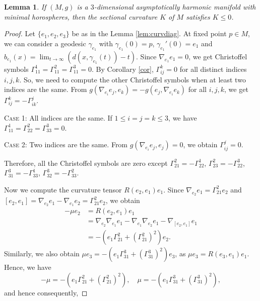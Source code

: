 \documentclass[12pt,a4paper]{amsart}
\newtheorem{Lem}[Thm]{Lemma}
\theoremstyle{definition}
\theoremstyle{remark}
\newcommand \<{\langle}
\renewcommand \>{\rangle}
\begin{document}
\begin{Lem}\label{lem:curvature}
 If $(M,g)$ is a $3$-dimensional asymptotically harmonic manifold with minimal horospheres, then the sectional curvature $K$ of $M$ satisfies $K \le 0$.
\end{Lem}
\begin{proof}
Let  $\{e_1,e_2,e_3\}$  be as in the  Lemma \ref{lem:curvdiag}. At fixed point $p\in M$,  we can consider a geodesic $\gamma_{e_1}$ with $\gamma_{e_1}(0)=p$, $\gamma_{e_1}'(0)=e_1$ and $b_{e_1}(x)=\displaystyle\lim_{t\to \infty}(d(x,\gamma_{e_1}(t))-t)$. Since $\nabla_{e_1}e_1 = 0$, we get Christoffel symbols $\Gamma_{11}^{1}=\Gamma_{11}^{2}=\Gamma_{11}^{3}=0$. By {Corollary} \ref{cor}, $\Gamma_{ij}^k =0$ for all distinct indices $i,j,k$. So, we need to compute  {the} other Christoffel symbols when at least two indices are the same. From $g(\nabla_{e_i}e_j , e_k) = -g(e_j, \nabla_{e_i} e_k)$ for all $i,j,k$, we get $\Gamma_{ij}^k = -\Gamma_{ik}^j$.

\smallskip
\noindent\textsc{Case 1}: All indices are the same.  If $1\le i=j=k \le 3$, we have $\Gamma_{11}^1 = \Gamma_{22}^2 = \Gamma_{33}^3=0$.


\smallskip
\noindent\textsc{Case 2}: Two indices are the same. From $g(\nabla_{e_i}e_j , e_j)=0$, we obtain $\Gamma_{ij}^j=0$.

Therefore, all the Christoffel symbols are zero except $\Gamma_{21}^2=-\Gamma_{22}^1$, $\Gamma_{23}^2=-\Gamma_{22}^3$, $\Gamma_{31}^3=-\Gamma_{33}^1$, $\Gamma_{32}^3=-\Gamma_{33}^2$.

Now we compute the curvature tensor $R(e_2,e_1)e_1$. Since $\nabla_{e_2}e_1 = \Gamma_{21}^2 e_2$ and $[e_2,e_1] = \nabla_{e_2}e_1 - \nabla_{e_1}e_2 = \Gamma_{21}^2 e_2$, we obtain
\begin{align*}
    -\mu e_2 &= R(e_2,e_1)e_1\\
    &=\nabla_{e_2}\nabla_{e_1}e_1 - \nabla_{e_1}\nabla_{e_2}e_1 - \nabla_{[e_2,e_1]}e_1\\
    &=-\left(e_1 \Gamma_{21}^2 +\left(\Gamma_{21}^2\right)^2\right)e_2.
\end{align*}
Similarly, we also obtain $\mu e_3  =-\left(e_1 \Gamma_{31}^3 +\left(\Gamma_{31}^3\right)^2 \right)e_3$,
as  $\mu e_3 = R(e_3 ,e_1)e_1$.
Hence,  we have
\begin{equation*}
    -\mu = -\left(e_1 \Gamma_{21}^2 +\left(\Gamma_{21}^2\right)^2\right),\quad \mu=-\left(e_1 \Gamma_{31}^3 +\left(\Gamma_{31}^3\right)^2 \right),
\end{equation*}
and hence consequently,


\end{proof}
\end{document}
